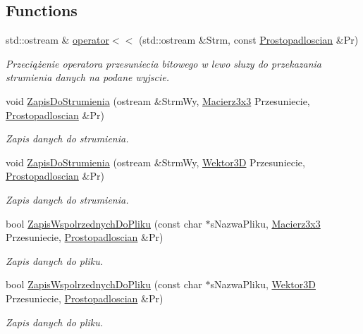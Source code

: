 \subsection*{Functions}
\begin{DoxyCompactItemize}
\item 
std\+::ostream \& \hyperlink{Prostopadloscian_8hh_a0a77f9bb1cc3f07e11031b947e6e7322}{operator$<$$<$} (std\+::ostream \&Strm, const \hyperlink{classProstopadloscian}{Prostopadloscian} \&Pr)
\begin{DoxyCompactList}\small\item\em Przeciążenie operatora przesuniecia bitowego w lewo sluzy do przekazania strumienia danych na podane wyjscie. \end{DoxyCompactList}\item 
void \hyperlink{Prostopadloscian_8hh_a42155017ae1f49acb330164b11df2b97}{Zapis\+Do\+Strumienia} (ostream \&Strm\+Wy, \hyperlink{classMacierz}{Macierz3x3} Przesuniecie, \hyperlink{classProstopadloscian}{Prostopadloscian} \&Pr)
\begin{DoxyCompactList}\small\item\em Zapis danych do strumienia. \end{DoxyCompactList}\item 
void \hyperlink{Prostopadloscian_8hh_a1fd5a38f6b20a1ea903c1ec882222dd6}{Zapis\+Do\+Strumienia} (ostream \&Strm\+Wy, \hyperlink{classWektor}{Wektor3D} Przesuniecie, \hyperlink{classProstopadloscian}{Prostopadloscian} \&Pr)
\begin{DoxyCompactList}\small\item\em Zapis danych do strumienia. \end{DoxyCompactList}\item 
bool \hyperlink{Prostopadloscian_8hh_a7b6b375f9857993a4457fc37f47d585d}{Zapis\+Wspolrzednych\+Do\+Pliku} (const char $\ast$s\+Nazwa\+Pliku, \hyperlink{classMacierz}{Macierz3x3} Przesuniecie, \hyperlink{classProstopadloscian}{Prostopadloscian} \&Pr)
\begin{DoxyCompactList}\small\item\em Zapis danych do pliku. \end{DoxyCompactList}\item 
bool \hyperlink{Prostopadloscian_8hh_a140b1afdfa25067b9e9fcd7a738af090}{Zapis\+Wspolrzednych\+Do\+Pliku} (const char $\ast$s\+Nazwa\+Pliku, \hyperlink{classWektor}{Wektor3D} Przesuniecie, \hyperlink{classProstopadloscian}{Prostopadloscian} \&Pr)
\begin{DoxyCompactList}\small\item\em Zapis danych do pliku. \end{DoxyCompactList}\end{DoxyCompactItemize}


